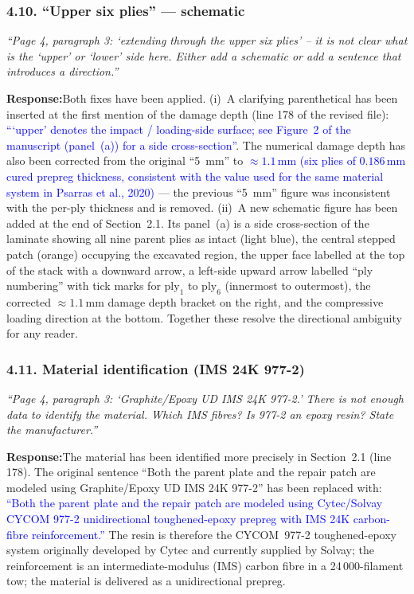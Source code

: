 \documentclass[11pt,a4paper]{article}
\newcommand{\new}[1]{\textcolor{blue}{#1}}
\newcommand{\rev}[1]{\par\noindent\textit{\small #1}\par\smallskip}
\newcommand{\resp}{\par\noindent\textbf{Response:}\space}
\begin{document}
\subsubsection*{4.10. ``Upper six plies'' --- schematic}
\rev{``Page 4, paragraph 3: `extending through the upper six plies' -- it is not clear what is the `upper' or `lower' side here. Either add a schematic or add a sentence that introduces a direction.''}
\resp Both fixes have been applied. (i)~A clarifying parenthetical has been inserted at the first mention of the damage depth (line 178 of the revised file): \new{```upper' denotes the impact / loading-side surface; see Figure~2 of the manuscript (panel~(a)) for a side cross-section''}. The numerical damage depth has also been corrected from the original ``5~mm'' to \new{$\approx 1.1$\,mm (six plies of $0.186$\,mm cured prepreg thickness, consistent with the value used for the same material system in Psarras et al., 2020)} --- the previous ``5~mm'' figure was inconsistent with the per-ply thickness and is removed. (ii)~A new schematic figure has been added at the end of Section~2.1. Its panel~(a) is a side cross-section of the laminate showing all nine parent plies as intact (light blue), the central stepped patch (orange) occupying the excavated region, the upper face labelled at the top of the stack with a downward arrow, a left-side upward arrow labelled ``ply numbering'' with tick marks for $\text{ply}_1$ to $\text{ply}_6$ (innermost to outermost), the corrected $\approx 1.1$\,mm damage depth bracket on the right, and the compressive loading direction at the bottom. Together these resolve the directional ambiguity for any reader.

\subsubsection*{4.11. Material identification (IMS 24K 977-2)}
\rev{``Page 4, paragraph 3: `Graphite/Epoxy UD IMS 24K 977-2.' There is not enough data to identify the material. Which IMS fibres? Is 977-2 an epoxy resin? State the manufacturer.''}
\resp The material has been identified more precisely in Section~2.1 (line 178). The original sentence ``Both the parent plate and the repair patch are modeled using Graphite/Epoxy UD IMS 24K 977-2'' has been replaced with: \new{``Both the parent plate and the repair patch are modeled using Cytec/Solvay CYCOM 977-2 unidirectional toughened-epoxy prepreg with IMS 24K carbon-fibre reinforcement.''} The resin is therefore the CYCOM~977-2 toughened-epoxy system originally developed by Cytec and currently supplied by Solvay; the reinforcement is an intermediate-modulus (IMS) carbon fibre in a 24\,000-filament tow; the material is delivered as a unidirectional prepreg.
\end{document}
